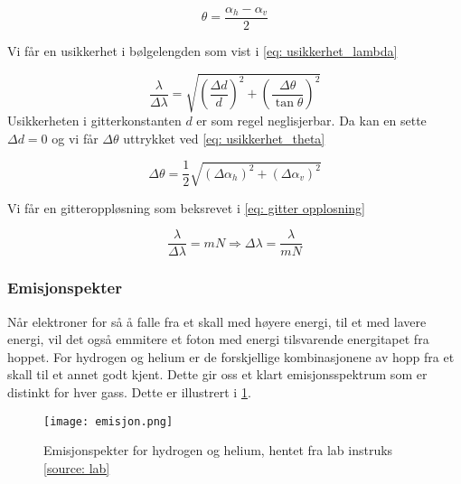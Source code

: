 \documentclass[reprint,norsk,notitlepage,floatfix]{revtex4-2}
\begin{document}
      \begin{equation}\label{eq: avg_angle}
        θ = \frac{α_h - α_v}{2}
      \end{equation}
      
      Vi får en usikkerhet i bølgelengden som vist i \cref{eq: usikkerhet_lambda}
      
      \begin{equation}\label{eq: usikkerhet_lambda}
        \frac{λ}{Δλ} = \sqrt{\left(\frac{Δd}{d}\right)^2 + \left(\frac{Δθ}{\tan θ}\right)^2}
      \end{equation}
      Usikkerheten i gitterkonstanten $d$ er som regel neglisjerbar. Da kan en sette $Δd = 0$ og vi får $Δθ$ uttrykket ved \cref{eq: usikkerhet_theta}
      
      \begin{equation}\label{eq: usikkerhet_theta}
        Δθ = \frac{1}{2} \sqrt{(Δα_h)^2 + (Δα_v)^2}
      \end{equation}
      
      Vi får en gitteroppløsning som beksrevet i \cref{eq: gitter opplosning}
      
      \begin{equation}\label{eq: gitter opplosning}
        \frac{λ}{Δλ} = mN ⇒ Δλ = \frac{λ}{mN}
      \end{equation}
      
    \subsubsection*{Emisjonspekter}
      Når elektroner for så å falle fra et skall med høyere energi, til et med lavere energi, vil det også emmitere et foton med energi tilsvarende energitapet fra hoppet. For hydrogen og helium er de forskjellige kombinasjonene av hopp fra et skall til et annet godt kjent. Dette gir oss et klart emisjonsspektrum som er distinkt for hver gass. Dette er illustrert i \cref{fig: emisjonsspekter}. 
      
      \begin{figure}[h!]
        \centering
        \texttt{[image: emisjon.png]}
        \caption{Emisjonspekter for hydrogen og helium, hentet fra lab instruks \ref{source: lab}}
        \label{fig: emisjonsspekter}
      \end{figure}
      
      
\end{document}
